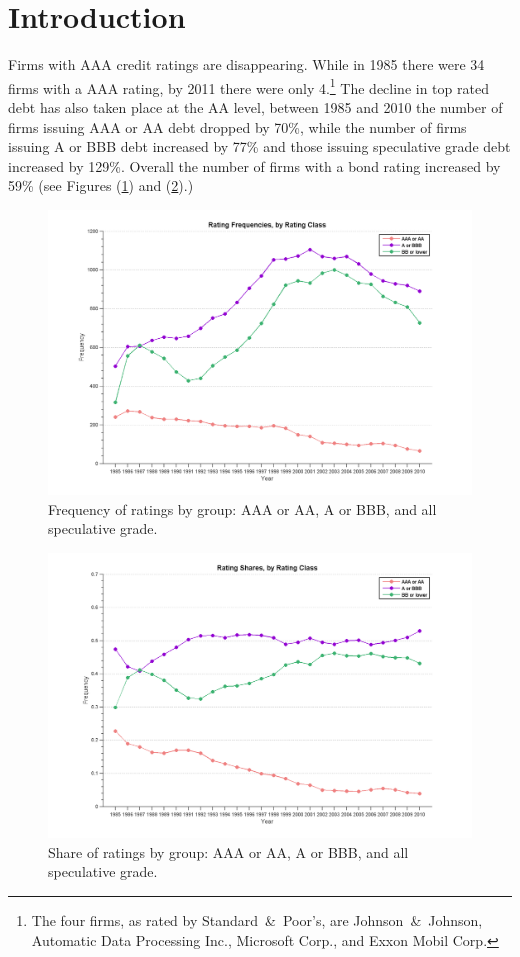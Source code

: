\documentclass[notitlepage]{article}
\begin{document}
\section{Introduction}
Firms with AAA credit ratings are disappearing. While in 1985 there were 34 firms with a AAA rating, by 2011 there were only 4.\footnote{The four firms, as rated by Standard~\&~Poor's, are Johnson~\&~Johnson, Automatic Data Processing Inc., Microsoft Corp., and Exxon Mobil Corp.} The decline in top rated debt has also taken place at the AA level, between 1985 and 2010 the number of firms issuing AAA or AA debt dropped by 70\%, while the number of firms issuing A or BBB debt increased by 77\% and those issuing speculative grade debt increased by 129\%. Overall the number of firms with a bond rating increased by 59\% (see Figures (\ref{fig:count}) and (\ref{fig:share}).)

\begin{figure}[ht]
\centering
\includegraphics[width=\textwidth]{rate_freq.png}
\caption{Frequency of ratings by group: AAA or AA, A or BBB, and all speculative grade.}
\label{fig:count}
\end{figure}

\begin{figure}[ht]
\centering
\includegraphics[width=\textwidth]{rate_share.png}
\caption{Share of ratings by group: AAA or AA, A or BBB, and all speculative grade.}
\label{fig:share}
\end{figure}
\end{document}
